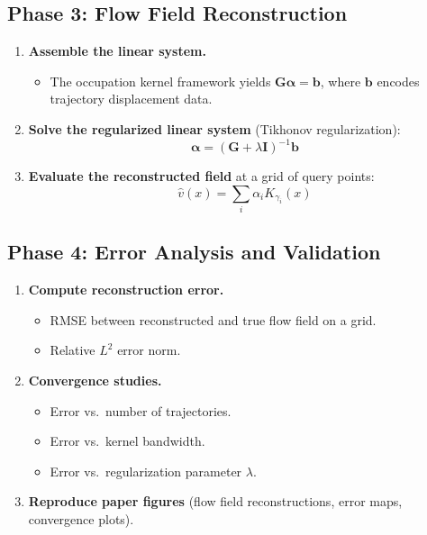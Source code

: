 \documentclass[11pt,a4paper]{article}
\begin{document}
\subsection{Phase 3: Flow Field Reconstruction}
\begin{enumerate}[label=\textbf{3.\arabic*}]
  \item \textbf{Assemble the linear system.}
    \begin{itemize}
      \item The occupation kernel framework yields $\mathbf{G} \boldsymbol{\alpha} = \mathbf{b}$, where $\mathbf{b}$ encodes trajectory displacement data.
    \end{itemize}
  \item \textbf{Solve the regularized linear system} (Tikhonov regularization):
    \begin{equation*}
      \boldsymbol{\alpha} = (\mathbf{G} + \lambda \mathbf{I})^{-1} \mathbf{b}
    \end{equation*}
  \item \textbf{Evaluate the reconstructed field} at a grid of query points:
    \begin{equation*}
      \hat{v}(x) = \sum_i \alpha_i K_{\gamma_i}(x)
    \end{equation*}
\end{enumerate}

\subsection{Phase 4: Error Analysis and Validation}
\begin{enumerate}[label=\textbf{4.\arabic*}]
  \item \textbf{Compute reconstruction error.}
    \begin{itemize}
      \item RMSE between reconstructed and true flow field on a grid.
      \item Relative $L^2$ error norm.
    \end{itemize}
  \item \textbf{Convergence studies.}
    \begin{itemize}
      \item Error vs.\ number of trajectories.
      \item Error vs.\ kernel bandwidth.
      \item Error vs.\ regularization parameter $\lambda$.
    \end{itemize}
  \item \textbf{Reproduce paper figures} (flow field reconstructions, error maps, convergence plots).
\end{enumerate}
\end{document}
